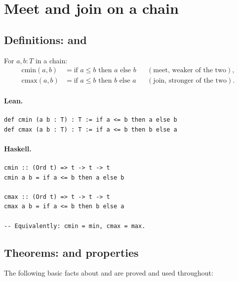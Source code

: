 \documentclass[11pt,a4paper]{article}
\begin{document}
\section{Meet and join on a chain}

\subsection{Definitions:  and }

\begin{defn}
For $a, b : T$ in a chain:
\begin{align*}
  \mathrm{cmin}(a, b) &= \text{if } a \le b \text{ then } a \text{ else } b
    && (\text{meet, weaker of the two}), \\
  \mathrm{cmax}(a, b) &= \text{if } a \le b \text{ then } b \text{ else } a
    && (\text{join, stronger of the two}).
\end{align*}
\end{defn}

\paragraph{Lean.}
\begin{lstlisting}[style=lean]
def cmin (a b : T) : T := if a <= b then a else b
def cmax (a b : T) : T := if a <= b then b else a
\end{lstlisting}

\paragraph{Haskell.}
\begin{lstlisting}[style=haskell]
cmin :: (Ord t) => t -> t -> t
cmin a b = if a <= b then a else b

cmax :: (Ord t) => t -> t -> t
cmax a b = if a <= b then b else a

-- Equivalently: cmin = min, cmax = max.
\end{lstlisting}

\subsection{Theorems:  and  properties}

The following basic facts about  and  are proved
and used throughout:
\end{document}
